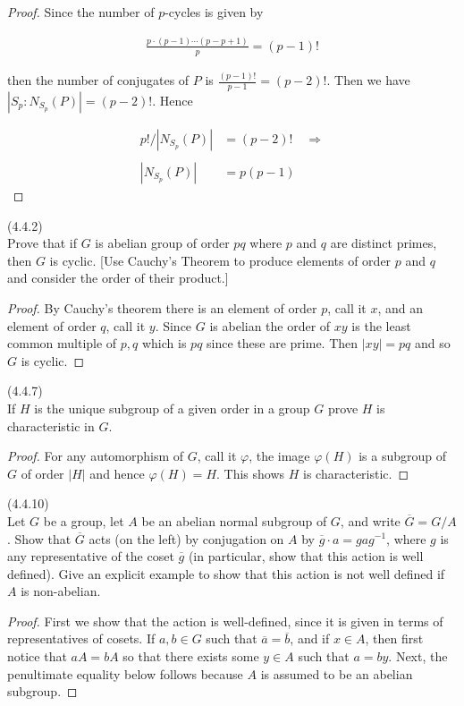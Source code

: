 \documentclass{exam}
\begin{document}
\begin{questions}
\begin{proof}
  Since the number of $p$-cycles is given by

  \begin{align*}
    \frac{p\cdot(p-1)\cdots (p-p+1)}{p} = (p-1)!
  \end{align*}

  then the number of conjugates of $P$ is $\frac{(p-1)!}{p-1}=(p-2)!$. Then we have $|S_p:N_{S_p}(P)| = (p-2)!$.  Hence

  \begin{align*}
    p!/|N_{S_p}(P)| &= (p-2)! \quad \Longrightarrow \\\\
    |N_{S_p}(P)|&=p(p-1)
  \end{align*}
\end{proof}

\question(4.4.2)\\
Prove that if $G$ is abelian group of order $pq$ where $p$ and $q$ are distinct primes, then $G$ is cyclic. [Use Cauchy's Theorem to produce elements of order $p$ and $q$ and consider the order of their product.]

\begin{proof}
  By Cauchy's theorem there is an element of order $p$, call it $x$, and an element of order $q$, call it $y$.  Since $G$ is abelian the order of $xy$ is the least common multiple of $p,q$ which is $pq$ since these are prime.  Then $|xy|=pq$ and so $G$ is cyclic.
\end{proof}

\question(4.4.7)\\
If $H$ is the unique subgroup of a given order in a group $G$ prove $H$ is characteristic in $G$.

\begin{proof}
  For any automorphism of $G$, call it $\varphi$, the image $\varphi(H)$ is a subgroup of $G$ of order $|H|$ and hence $\varphi(H)=H$.  This shows $H$ is characteristic.
\end{proof}

\question(4.4.10)\\
Let $G$ be a group, let $A$ be an abelian normal subgroup of $G$, and write $\overline G = G/A$.  Show that $\overline G$ acts (on the left) by conjugation on $A$ by $\overline g\cdot a = gag^{-1}$, where $g$ is any representative of the coset $\overline g$ (in particular, show that this action is well defined).  Give an explicit example to show that this action is not well defined if $A$ is non-abelian.

\begin{proof}
  First we show that the action is well-defined, since it is given in terms of representatives of cosets.  If $a,b\in G$ such that $\overline a = \overline b$, and if $x\in A$, then first notice that $aA=bA$ so that there exists some $y\in A$ such that $a=by$.  Next, the penultimate equality below follows because $A$ is assumed to be an abelian subgroup.


\end{proof}
\end{questions}
\end{document}
